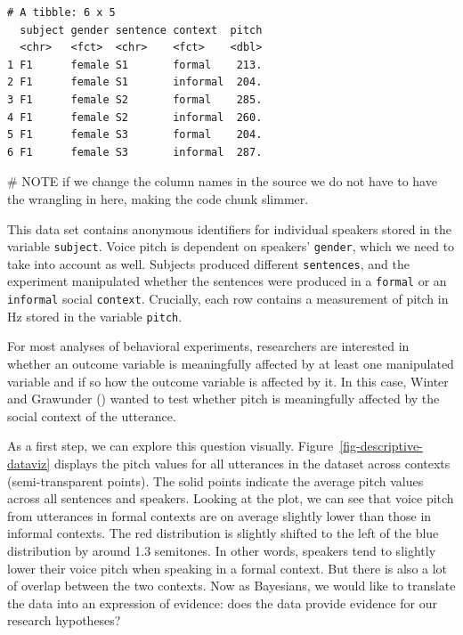 \documentclass[
  doc,
  floatsintext,
  longtable,
  nolmodern,
  notxfonts,
  notimes,
  colorlinks=true,linkcolor=blue,citecolor=blue,urlcolor=blue]{apa7}
\newenvironment{Shaded}{\begin{snugshade}}{\end{snugshade}}
\newcommand{\AlertTok}[1]{\textcolor[rgb]{0.68,0.00,0.00}{#1}}
\newcommand{\CommentTok}[1]{\textcolor[rgb]{0.37,0.37,0.37}{#1}}
\begin{document}
\begin{verbatim}
# A tibble: 6 x 5
  subject gender sentence context  pitch
  <chr>   <fct>  <chr>    <fct>    <dbl>
1 F1      female S1       formal    213.
2 F1      female S1       informal  204.
3 F1      female S2       formal    285.
4 F1      female S2       informal  260.
5 F1      female S3       formal    204.
6 F1      female S3       informal  287.
\end{verbatim}

\begin{Shaded}
\begin{Highlighting}[]
\CommentTok{\# }\AlertTok{NOTE}\CommentTok{  if we change the column names in the source we do not have to have the wrangling in here, making the code  chunk slimmer.}
\end{Highlighting}
\end{Shaded}

This data set contains anonymous identifiers for individual speakers
stored in the variable \texttt{subject}. Voice pitch is dependent on
speakers' \texttt{gender}, which we need to take into account as well.
Subjects produced diﬀerent \texttt{sentences}, and the experiment
manipulated whether the sentences were produced in a \texttt{formal} or
an \texttt{informal} social \texttt{context}. Crucially, each row
contains a measurement of pitch in Hz stored in the variable
\texttt{pitch}.

For most analyses of behavioral experiments, researchers are interested
in whether an outcome variable is meaningfully affected by at least one
manipulated variable and if so how the outcome variable is affected by
it. In this case, Winter and Grawunder
()
wanted to test whether pitch is meaningfully affected by the social
context of the utterance.

As a first step, we can explore this question visually.
Figure~\ref{fig-descriptive-dataviz} displays the pitch values for all
utterances in the dataset across contexts (semi-transparent points). The
solid points indicate the average pitch values across all sentences and
speakers. Looking at the plot, we can see that voice pitch from
utterances in formal contexts are on average slightly lower than those
in informal contexts. The red distribution is slightly shifted to the
left of the blue distribution by around 1.3 semitones. In other words,
speakers tend to slightly lower their voice pitch when speaking in a
formal context. But there is also a lot of overlap between the two
contexts. Now as Bayesians, we would like to translate the data into an
expression of evidence: does the data provide evidence for our research
hypotheses?
\end{document}
